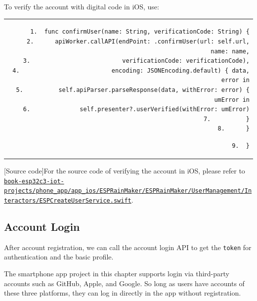 \documentclass[a4paper,12pt,openany]{book}
\renewcommand{\ttfamily}{\fontfamily{pcr}\selectfont}
\renewcommand{\arraystretch}{1}
\newenvironment{codebloc}{ %
    \ttfamily\footnotesize
    \renewcommand{\arraystretch}{1}
}
\newcommand{\note}[2][NOTE]{ %
\vspace{6pt}
\begin{tabular}{b{\textwidth}}
\hline
\fontfamily{phv}\selectfont \textbf{#1}\\
\leftskip 1em #2\\
\hline
\end{tabular}
}
\begin{document}

To verify the account with digital code in iOS, use:

\begin{codebloc}
\begin{tabular}{d}
\vspace{2pt}
\begin{verbatim}
1.  func confirmUser(name: String, verificationCode: String) {
2.      apiWorker.callAPI(endPoint: .confirmUser(url: self.url, name: name,
3.                          verificationCode: verificationCode),
4.                          encoding: JSONEncoding.default) { data, error in
5.          self.apiParser.parseResponse(data, withError: error) { umError in
6.              self.presenter?.userVerified(withError: umError)
7.          }
8.      }
\end{verbatim}
\verb|9.  }|
\end{tabular}
\end{codebloc}

\note[Source code]{For the source code of verifying the account in iOS, please refer to \href{https://github.com/espressif/book-esp32c3-iot-projects/blob/main/phone_app/app_ios/ESPRainMaker/ESPRainMaker/UserManagement/Interactors/ESPCreateUserService.swift}{\texttt{book-esp32c3-\newline iot-projects/phone\_app/app\_ios/ESPRainMaker/ESPRainMaker/\newline UserManagement/Interactors/ESPCreateUserService.swift}}.}

\subsection{Account Login}
After account registration, we can call the account login API to get the \verb|token| for authentication and the basic profile.

The smartphone app project in this chapter supports login via third-party accounts such as GitHub, Apple, and Google. So long as users have accounts of these three platforms, they can log in directly in the app without registration.
\end{document}
